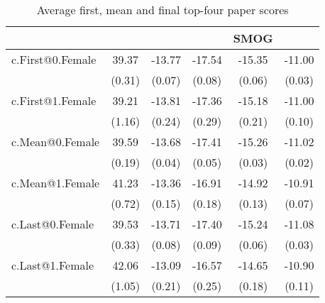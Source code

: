 \begin{table}[H]
    \footnotesize
    \centering
    \begin{threeparttable}
        \caption{Average first, mean and final top-four paper scores}
        \label{tableH1}
        \begin{tabular}{p{3cm}S@{}S@{}S@{}S@{}S@{}}
            \toprule
            &{}&{}&{}&{SMOG}&{}\\
            \midrule
            \quad c.First@0.Female        &       39.37&      -13.77&      -17.54&      -15.35&      -11.00\\
                                          &      (0.31)&      (0.07)&      (0.08)&      (0.06)&      (0.03)\\
            \quad c.First@1.Female        &       39.21&      -13.81&      -17.36&      -15.18&      -11.00\\
                                          &      (1.16)&      (0.24)&      (0.29)&      (0.21)&      (0.10)\\
            \quad c.Mean@0.Female         &       39.59&      -13.68&      -17.41&      -15.26&      -11.02\\
                                          &      (0.19)&      (0.04)&      (0.05)&      (0.03)&      (0.02)\\
            \quad c.Mean@1.Female         &       41.23&      -13.36&      -16.91&      -14.92&      -10.91\\
                                          &      (0.72)&      (0.15)&      (0.18)&      (0.13)&      (0.07)\\
            \quad c.Last@0.Female         &       39.53&      -13.71&      -17.40&      -15.24&      -11.08\\
                                          &      (0.33)&      (0.08)&      (0.09)&      (0.06)&      (0.03)\\
            \quad c.Last@1.Female         &       42.06&      -13.09&      -16.57&      -14.65&      -10.90\\
                                          &      (1.05)&      (0.21)&      (0.25)&      (0.18)&      (0.11)\\

\end{tabular}
\end{threeparttable}
\end{table}
